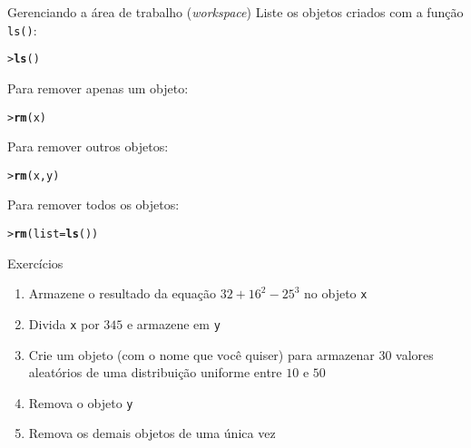 \documentclass[10pt,handout]{beamer}\usepackage{graphicx, color}
\makeatletter
\newcommand{\hlfunctioncall}[1]{\textcolor[rgb]{0,0,0.545098039215686}{\textbf{#1}}}%
\newenvironment{kframe}{%
 \def\at@end@of@kframe{}%
 \ifinner\ifhmode%
  \def\at@end@of@kframe{\end{minipage}}%
  \begin{minipage}{\columnwidth}%
 \fi\fi%
 \def\FrameCommand##1{\hskip\@totalleftmargin \hskip-\fboxsep
 \colorbox{shadecolor}{##1}\hskip-\fboxsep
     \hskip-\linewidth \hskip-\@totalleftmargin \hskip\columnwidth}%
 \MakeFramed {\advance\hsize-\width
   \@totalleftmargin\z@ \linewidth\hsize
   \@setminipage}}%
 {\par\unskip\endMakeFramed%
 \at@end@of@kframe}
\newenvironment{knitrout}{}{} %
\makeatother
\begin{document}
\begin{frame}[fragile=singleslide]{Gerenciando a área de trabalho (\textit{workspace})}
Liste os objetos criados com a função \texttt{ls()}:
\begin{knitrout}\small
{}\color{fgcolor}\begin{kframe}
\begin{alltt}
> \hlfunctioncall{ls}()
\end{alltt}
\end{kframe}
\end{knitrout}

Para remover apenas um objeto:
\begin{knitrout}\small
{}\color{fgcolor}\begin{kframe}
\begin{alltt}
> \hlfunctioncall{rm}(x)
\end{alltt}
\end{kframe}
\end{knitrout}

Para remover outros objetos:
\begin{knitrout}\small
{}\color{fgcolor}\begin{kframe}
\begin{alltt}
> \hlfunctioncall{rm}(x, y)
\end{alltt}
\end{kframe}
\end{knitrout}

Para remover todos os objetos:
\begin{knitrout}\small
{}\color{fgcolor}\begin{kframe}
\begin{alltt}
> \hlfunctioncall{rm}(list = \hlfunctioncall{ls}())
\end{alltt}
\end{kframe}
\end{knitrout}

\end{frame}

\begin{frame}[fragile=singleslide]{Exercícios}
  \begin{enumerate}
  \item Armazene o resultado da equação $32 + 16^2 - 25^3$ no objeto
    \verb|x|
  \item Divida \verb|x| por $345$ e armazene em \verb|y|
  \item Crie um objeto (com o nome que você quiser) para armazenar $30$
    valores aleatórios de uma distribuição uniforme entre $10$ e $50$
  \item Remova o objeto \verb|y|
  \item Remova os demais objetos de uma única vez
  \end{enumerate}
\end{frame}
\end{document}
